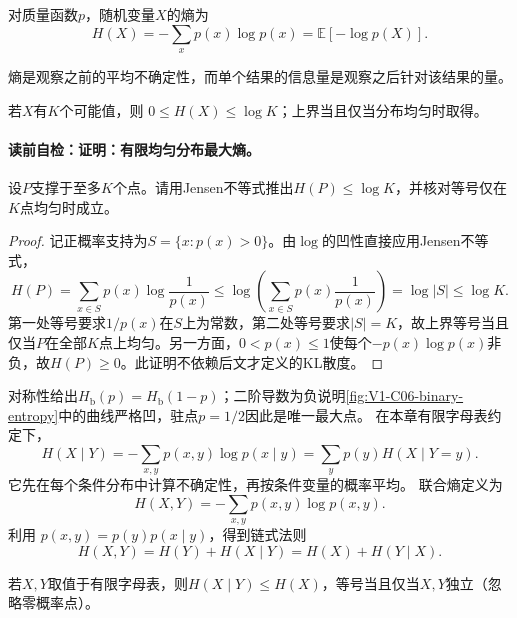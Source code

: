 \label{struct:V1-C06-CH07}
\begin{definition}[离散熵]
对质量函数$p$，随机变量$X$的熵为
\[
H(X)=-\sum_xp(x)\log p(x)=\mathbb E[-\log p(X)].
\]
\end{definition}
熵是观察之前的平均不确定性，而单个结果的信息量是观察之后针对该结果的量。

\label{struct:V1-C06-CH12}
\begin{theorem}[有限均匀分布最大熵]
若$X$有$K$个可能值，则 $0\le H(X)\le\log K$；上界当且仅当分布均匀时取得。
\end{theorem}
\label{struct:V1-C06-CH15}
\paragraph{读前自检：证明：有限均匀分布最大熵。}设$P$支撑于至多$K$个点。请用Jensen不等式推出$H(P)\le\log K$，并核对等号仅在$K$点均匀时成立。\par

\begin{proof}
记正概率支持为$S=\{x:p(x)>0\}$。由$\log$的凹性直接应用Jensen不等式，
\[
H(P)=\sum_{x\in S}p(x)\log\frac1{p(x)}
\le\log\!\left(\sum_{x\in S}p(x)\frac1{p(x)}\right)
=\log|S|\le\log K.
\]
第一处等号要求$1/p(x)$在$S$上为常数，第二处等号要求$|S|=K$，故上界等号当且仅当$P$在全部$K$点上均匀。另一方面，$0<p(x)\le1$使每个$-p(x)\log p(x)$非负，故$H(P)\ge0$。此证明不依赖后文才定义的KL散度。
\end{proof}

\label{struct:V1-C06-CH19}

对称性给出$H_{\mathrm b}(p)=H_{\mathrm b}(1-p)$；二阶导数为负说明\cref{fig:V1-C06-binary-entropy}中的曲线严格凹，驻点$p=1/2$因此是唯一最大点。
在本章有限字母表约定下，
\[
H(X\mid Y)=-\sum_{x,y}p(x,y)\log p(x\mid y)=\sum_yp(y)H(X\mid Y=y).
\]
它先在每个条件分布中计算不确定性，再按条件变量的概率平均。
联合熵定义为
\[
H(X,Y)=-\sum_{x,y}p(x,y)\log p(x,y).
\]
利用 $p(x,y)=p(y)p(x\mid y)$，得到链式法则
\[
H(X,Y)=H(Y)+H(X\mid Y)=H(X)+H(Y\mid X).
\]

\label{struct:V1-C06-CH13}
\begin{lemma}[条件化不增加离散熵]
若$X,Y$取值于有限字母表，则$H(X\mid Y)\le H(X)$，等号当且仅当$X,Y$独立（忽略零概率点）。
\end{lemma}
